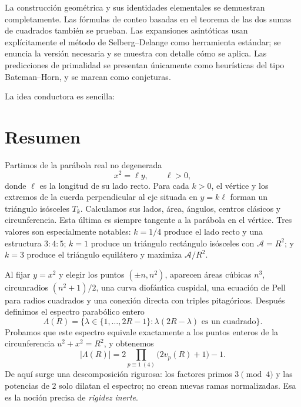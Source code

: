 \documentclass[11pt,a4paper,openany]{report}
\newcommand{\Lam}{\Lambda}
\newcommand{\Area}{\mathcal{A}}
\begin{document}
La construcción geométrica y sus identidades elementales se demuestran completamente. Las fórmulas de conteo basadas en el teorema de las dos sumas de cuadrados también se prueban. Las expansiones asintóticas usan explícitamente el método de Selberg--Delange como herramienta estándar; se enuncia la versión necesaria y se muestra con detalle cómo se aplica. Las predicciones de primalidad se presentan únicamente como heurísticas del tipo Bateman--Horn, y se marcan como conjeturas.

La idea conductora es sencilla:

\begin{center}
\end{center}

\chapter*{Resumen}

Partimos de la parábola real no degenerada
\[
 x^2=\ell y,\qquad \ell>0,
\]
donde \(\ell\) es la longitud de su lado recto. Para cada \(k>0\), el vértice y los extremos de la cuerda perpendicular al eje situada en \(y=k\ell\) forman un triángulo isósceles \(T_k\). Calculamos sus lados, área, ángulos, centros clásicos y circunferencia. Esta última es siempre tangente a la parábola en el vértice. Tres valores son especialmente notables: \(k=1/4\) produce el lado recto y una estructura \(3\!:\!4\!:\!5\); \(k=1\) produce un triángulo rectángulo isósceles con \(\Area=R^2\); y \(k=3\) produce el triángulo equilátero y maximiza \(\Area/R^2\).

Al fijar \(y=x^2\) y elegir los puntos \((\pm n,n^2)\), aparecen áreas cúbicas \(n^3\), circunradios \((n^2+1)/2\), una curva diofántica cuspidal, una ecuación de Pell para radios cuadrados y una conexión directa con triples pitagóricos. Después definimos el espectro parabólico entero
\[
 \Lam(R)=\{\lambda\in\{1,\dots,2R-1\}:\lambda(2R-\lambda)\text{ es un cuadrado}\}.
\]
Probamos que este espectro equivale exactamente a los puntos enteros de la circunferencia \(u^2+x^2=R^2\), y obtenemos
\[
 |\Lam(R)|=2\prod_{p\equiv1\ (4)}\bigl(2v_p(R)+1\bigr)-1.
\]
De aquí surge una descomposición rigurosa: los factores primos \(3\pmod4\) y las potencias de \(2\) solo dilatan el espectro; no crean nuevas ramas normalizadas. Esa es la noción precisa de \emph{rigidez inerte}.
\end{document}

